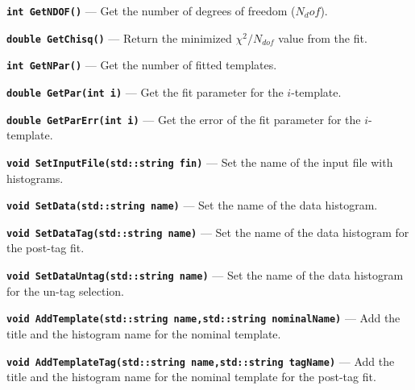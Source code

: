 \documentclass[12pt]{article}
\newcommand\verbbf[1]{\textcolor[rgb]{0,0,1}{\texttt{\textbf{#1}}}}
\begin{document}
\vspace{0.3cm}

\noindent \verbbf{int GetNDOF()} --- Get the number of degrees of freedom
($N_dof$).

\vspace{0.3cm}

\noindent \verbbf{double GetChisq()} --- Return the
minimized $\chi^{2}/N_{dof}$ value from the fit.

\vspace{0.3cm}

\noindent \verbbf{int GetNPar()} --- Get the number of fitted templates.

\vspace{0.3cm}

\noindent \verbbf{double GetPar(int i)} --- Get the fit parameter for
the $i$-template.

\vspace{0.3cm}

\noindent \verbbf{double GetParErr(int i)} --- Get the error of the
fit parameter for the $i$-template.

\vspace{0.3cm}

\noindent \verbbf{void SetInputFile(std::string fin)} --- Set the name
of the input file with histograms.

\vspace{0.3cm}

\noindent \verbbf{void SetData(std::string name)} --- Set the name of
the data histogram.

\vspace{0.3cm}

\noindent \verbbf{void SetDataTag(std::string name)} --- Set the name of
the data histogram for the post-tag fit.

\vspace{0.3cm}

\noindent \verbbf{void SetDataUntag(std::string name)} --- Set the name
of the data histogram for the un-tag selection.

\vspace{0.3cm}

\noindent \verbbf{void AddTemplate(std::string name,std::string nominalName)} ---
Add the title and the histogram name for the nominal template.

\vspace{0.3cm}

\noindent \verbbf{void AddTemplateTag(std::string name,std::string tagName)} ---
Add the title and the histogram name for the nominal template for the
post-tag fit.
\end{document}
